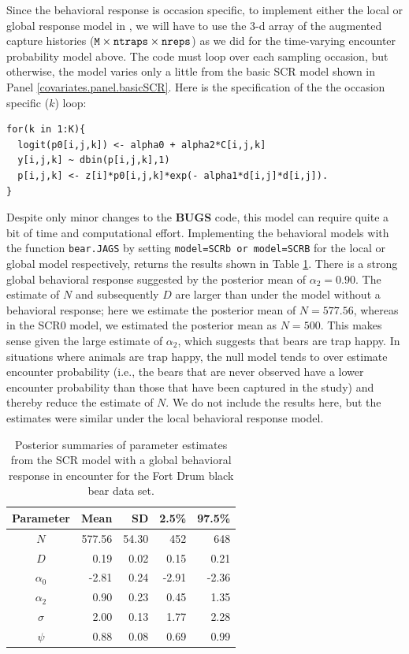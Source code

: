 Since the behavioral response is occasion specific, to implement
either the local or global response model in \jags, we will have to
use the 3-d array of the augmented capture histories ($\mbox{\tt M}
\times \mbox{\tt ntraps} \times \mbox{\tt nreps}$) as we did for the
time-varying encounter probability model above. The code must loop
over each sampling occasion, but otherwise, the model varies only a
little from the basic SCR model shown in Panel
\ref{covariates.panel.basicSCR}.  Here is the specification of the the
occasion specific ($k$) loop: 
{\small
\begin{verbatim}
for(k in 1:K){
  logit(p0[i,j,k]) <- alpha0 + alpha2*C[i,j,k]
  y[i,j,k] ~ dbin(p[i,j,k],1)
  p[i,j,k] <- z[i]*p0[i,j,k]*exp(- alpha1*d[i,j]*d[i,j]).
}
\end{verbatim}
}

Despite only minor changes to the {\bf BUGS} code, this model can
require quite a bit of time and computational effort.  
Implementing the behavioral models with the
function {\tt bear.JAGS} by setting {\tt model=SCRb or model=SCRB} for
the local or global model respectively, returns the results shown in
Table \ref{covariates.tab.SCRb}.  There is a strong global behavioral
response suggested by the posterior mean of $\alpha_2 = 0.90$.  The
estimate of $N$ and subsequently $D$ are larger than under the model
without a behavioral response; here we estimate the posterior mean of $N = 577.56$,
 whereas in the
SCR0 model, we estimated the posterior mean as $N = 500$.  
This makes sense given the large
estimate of $\alpha_2$, which suggests that bears are trap happy.  In
situations where animals are trap happy, the null model tends to over
estimate encounter probability (i.e., the bears that are never
observed have a lower encounter probability than those that have been
captured in the study) and thereby reduce the estimate of $N$.  We do
not include the results here, but the estimates were similar under the
local behavioral response model.

\begin{table}[ht]
\centering
\caption{Posterior summaries of parameter estimates from the SCR model with a 
global behavioral response in encounter for the Fort Drum black bear data set.}
\begin{tabular}{crrrr}
\hline \hline
Parameter & Mean & SD & 2.5\% & 97.5\% \\
\hline
$N$           &   577.56 &  54.30  & 452  & 648  \\
$D$           &    0.19     &  0.02    & 0.15 & 0.21 \\
$\alpha_0$  &    -2.81     & 0.24    & -2.91  & -2.36  \\
$\alpha_2$  & 0.90  &  0.23   & 0.45  &  1.35 \\
$\sigma$ & 2.00 &  0.13  &   1.77 & 2.28  \\ 
$\psi$  &   0.88 &  0.08  &  0.69 & 0.99  \\ \hline
\end{tabular}
\label{covariates.tab.SCRb}
\end{table}


